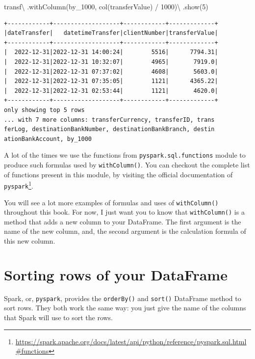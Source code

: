 \documentclass[
  11pt,
  letterpaper,
  DIV=11,
  numbers=noendperiod]{scrreprt}
\newenvironment{Shaded}{\begin{snugshade}}{\end{snugshade}}
\newcommand{\DecValTok}[1]{\textcolor[rgb]{0.68,0.00,0.00}{#1}}
\newcommand{\NormalTok}[1]{\textcolor[rgb]{0.00,0.23,0.31}{#1}}
\newcommand{\OperatorTok}[1]{\textcolor[rgb]{0.37,0.37,0.37}{#1}}
\newcommand{\StringTok}[1]{\textcolor[rgb]{0.13,0.47,0.30}{#1}}
\begin{document}
\begin{Shaded}
\begin{Highlighting}[]
\NormalTok{transf}\OperatorTok{\textbackslash{}}
\NormalTok{  .withColumn(}\StringTok{\textquotesingle{}by\_1000\textquotesingle{}}\NormalTok{, col(}\StringTok{\textquotesingle{}transferValue\textquotesingle{}}\NormalTok{) }\OperatorTok{/} \DecValTok{1000}\NormalTok{)}\OperatorTok{\textbackslash{}}
\NormalTok{  .show(}\DecValTok{5}\NormalTok{)}
\end{Highlighting}
\end{Shaded}

\begin{verbatim}
+------------+-------------------+------------+-------------+
|dateTransfer|   datetimeTransfer|clientNumber|transferValue|
+------------+-------------------+------------+-------------+
|  2022-12-31|2022-12-31 14:00:24|        5516|      7794.31|
|  2022-12-31|2022-12-31 10:32:07|        4965|       7919.0|
|  2022-12-31|2022-12-31 07:37:02|        4608|       5603.0|
|  2022-12-31|2022-12-31 07:35:05|        1121|      4365.22|
|  2022-12-31|2022-12-31 02:53:44|        1121|       4620.0|
+------------+-------------------+------------+-------------+
only showing top 5 rows
... with 7 more columns: transferCurrency, transferID, trans
ferLog, destinationBankNumber, destinationBankBranch, destin
ationBankAccount, by_1000
\end{verbatim}

A lot of the times we use the functions from
\texttt{pyspark.sql.functions} module to produce such formulas used by
\texttt{withColumn()}. You can checkout the complete list of functions
present in this module, by visiting the official documentation of
\texttt{pyspark}\footnote{\url{https://spark.apache.org/docs/latest/api/python/reference/pyspark.sql.html\#functions}}.

You will see a lot more examples of formulas and uses of
\texttt{withColumn()} throughout this book. For now, I just want you to
know that \texttt{withColumn()} is a method that adds a new column to
your DataFrame. The first argument is the name of the new column, and,
the second argument is the calculation formula of this new column.

\section{Sorting rows of your
DataFrame}\label{sorting-rows-of-your-dataframe}

Spark, or, \texttt{pyspark}, provides the \texttt{orderBy()} and
\texttt{sort()} DataFrame method to sort rows. They both work the same
way: you just give the name of the columns that Spark will use to sort
the rows.
\end{document}

